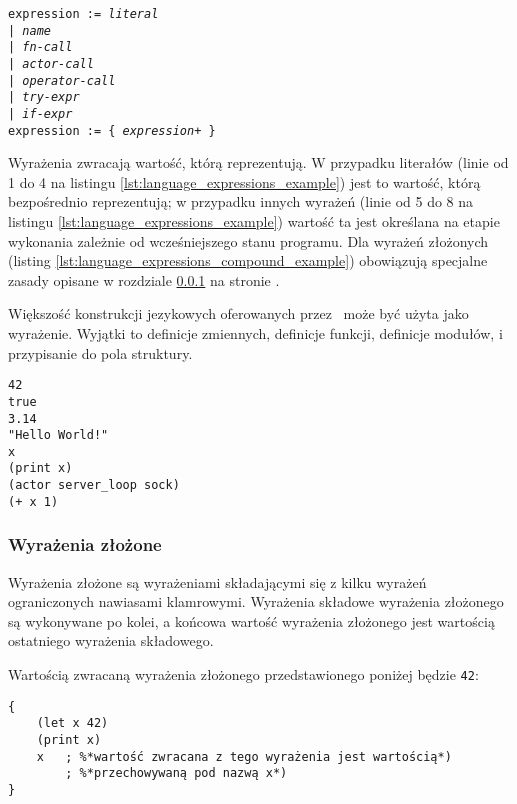 \texttt{expression := \emph{literal} \\
\phantom{expression :}| \emph{name} \\
\phantom{expression :}| \emph{fn-call} \\
\phantom{expression :}| \emph{actor-call} \\
\phantom{expression :}| \emph{operator-call} \\
\phantom{expression :}| \emph{try-expr} \\
\phantom{expression :}| \emph{if-expr}}
\\
\texttt{expression := \{ \emph{expression}+ \}}
\vspace{1em}

Wyrażenia zwracają wartość, którą reprezentują. W przypadku literałów (linie od
1 do 4 na listingu \ref{lst:language_expressions_example}) jest to wartość,
którą bezpośrednio reprezentują; w przypadku innych wyrażeń (linie od 5 do 8 na
listingu \ref{lst:language_expressions_example}) wartość ta jest określana na
etapie wykonania zależnie od wcześniejszego stanu programu. Dla wyrażeń
złożonych (listing \ref{lst:language_expressions_compound_example})
obowiązują specjalne zasady opisane w rozdziale \ref{language_expressions_compound}
na stronie \pageref{language_expressions_compound}.

Większość konstrukcji jezykowych oferowanych przez \ViuAct\ może być użyta jako
wyrażenie. Wyjątki to definicje zmiennych, definicje funkcji, definicje modułów,
i przypisanie do pola struktury.

\begin{lstlisting}[caption={Przykłady wyrażeń},label={lst:language_expressions_example}]
42
true
3.14
"Hello World!"
x
(print x)
(actor server_loop sock)
(+ x 1)
\end{lstlisting}

\subsubsection{Wyrażenia złożone}
\label{language_expressions_compound}

Wyrażenia złożone są wyrażeniami składającymi się z kilku wyrażeń ograniczonych nawiasami klamrowymi.
Wyrażenia składowe wyrażenia złożonego są wykonywane po kolei, a końcowa wartość wyrażenia złożonego jest
wartością ostatniego wyrażenia składowego.

Wartością zwracaną wyrażenia złożonego przedstawionego poniżej będzie \texttt{42}:

\begin{lstlisting}[caption={Wyrażenie złożone},label={lst:language_expressions_compound_example}]
{
    (let x 42)
    (print x)
    x   ; %*wartość zwracana z tego wyrażenia jest wartością*)
        ; %*przechowywaną pod nazwą x*)
}
\end{lstlisting}

